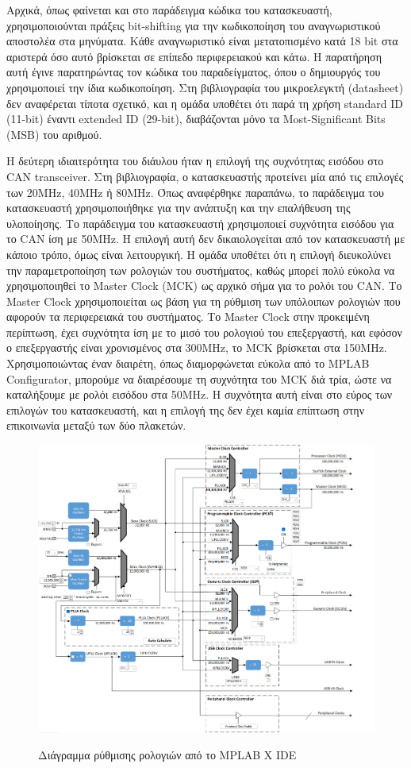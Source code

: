 \documentclass[a4paper,nobib,justified]{tufte-book}
\begin{document}
Αρχικά, όπως φαίνεται και στο παράδειγμα κώδικα του κατασκευαστή, χρησιμοποιούνται πράξεις bit-shifting για την κωδικοποίηση του αναγνωριστικού αποστολέα στα μηνύματα. Κάθε αναγνωριστικό είναι μετατοπισμένο κατά 18 bit στα αριστερά όσο αυτό βρίσκεται σε επίπεδο περιφερειακού και κάτω. Η παρατήρηση αυτή έγινε παρατηρώντας τον κώδικα του παραδείγματος, όπου ο δημιουργός του χρησιμοποιεί την ίδια κωδικοποίηση. Στη βιβλιογραφία του μικροελεγκτή (datasheet) δεν αναφέρεται τίποτα σχετικό, και η ομάδα υποθέτει ότι παρά τη χρήση standard ID (11-bit) έναντι extended ID (29-bit), διαβάζονται μόνο τα Most-Significant Bits (MSB) του αριθμού.

Η δεύτερη ιδιαιτερότητα του διάυλου ήταν η επιλογή της συχνότητας εισόδου στο CAN transceiver. Στη βιβλιογραφία, ο κατασκευαστής προτείνει μία από τις επιλογές των 20MHz, 40MHz ή 80MHz. Όπως αναφέρθηκε παραπάνω, το παράδειγμα του κατασκευαστή χρησιμοποιήθηκε για την ανάπτυξη και την επαλήθευση της υλοποίησης. Το παράδειγμα του κατασκευαστή χρησιμοποιεί συχνότητα εισόδου για το CAN ίση με 50MHz. Η επιλογή αυτή δεν δικαιολογείται από τον κατασκευαστή με κάποιο τρόπο, όμως είναι λειτουργική. Η ομάδα υποθέτει ότι η επιλογή διευκολύνει την παραμετροποίηση των ρολογιών του συστήματος, καθώς μπορεί πολύ εύκολα να χρησιμοποιηθεί το Master Clock (MCK) ως αρχικό σήμα για το ρολόι του CAN. Το Master Clock χρησιμοποιείται ως βάση για τη ρύθμιση των υπόλοιπων ρολογιών που αφορούν τα περιφερειακά του συστήματος. Το Master Clock στην προκειμένη περίπτωση, έχει συχνότητα ίση με το μισό του ρολογιού του επεξεργαστή, και εφόσον ο επεξεργαστής είναι χρονισμένος στα 300MHz, το MCK βρίσκεται στα 150MHz. Χρησιμοποιώντας έναν διαιρέτη, όπως διαμορφώνεται εύκολα από το MPLAB Configurator, μπορούμε να διαιρέσουμε τη συχνότητα του MCK διά τρία, ώστε να καταλήξουμε με ρολόι εισόδου στα 50MHz. Η συχνότητα αυτή είναι στο εύρος των επιλογών του κατασκευαστή, και η επιλογή της δεν έχει καμία επίπτωση στην επικοινωνία μεταξύ των δύο πλακετών.

\begin{figure}
	\includegraphics[width=0.8\linewidth]{media/images/mplab-clock-diagram.png}
	\label{fig:mplab-clock}
	\caption{Διάγραμμα ρύθμισης ρολογιών από το MPLAB X IDE}
\end{figure}
\end{document}
